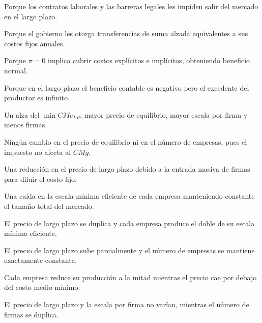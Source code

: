 \begin{opts}
    \item Porque los contratos laborales y las barreras legales les impiden salir del mercado en el largo plazo.
    \item Porque el gobierno les otorga transferencias de suma alzada equivalentes a sus costos fijos anuales.
    \item Porque $\pi = 0$ implica cubrir costos explícitos e implícitos, obteniendo beneficio normal.
    \item Porque en el largo plazo el beneficio contable es negativo pero el excedente del productor es infinito.
\end{opts}

\begin{opts}
    \item Un alza del $\min CMe_{LP}$, mayor precio de equilibrio, mayor escala por firma y menos firmas.
    \item Ningún cambio en el precio de equilibrio ni en el número de empresas, pues el impuesto no afecta al $CMg$.
    \item Una reducción en el precio de largo plazo debido a la entrada masiva de firmas para diluir el costo fijo.
    \item Una caída en la escala mínima eficiente de cada empresa manteniendo constante el tamaño total del mercado.
\end{opts}

\begin{opts}
    \item El precio de largo plazo se duplica y cada empresa produce el doble de su escala mínima eficiente.
    \item El precio de largo plazo sube parcialmente y el número de empresas se mantiene exactamente constante.
    \item Cada empresa reduce su producción a la mitad mientras el precio cae por debajo del costo medio mínimo.
    \item El precio de largo plazo y la escala por firma no varían, mientras el número de firmas se duplica.
\end{opts}

